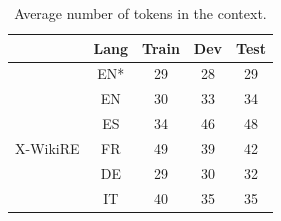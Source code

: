 \begin{table}[h!]
  \centering
    \begin{tabular}{c|c|ccc}
    \toprule
    \multicolumn{1}{r}{} & Lang  & Train & Dev   & Test \\
    \midrule
    \cite{levy2017zero} & EN*    & 29 & 28 & 29 \\
    \midrule
    \multirow{5}[2]{*}{X-WikiRE} & EN    & 30 & 33 & 34 \\
          & ES    & 34 & 46 & 48 \\
          & FR    & 49 & 39 & 42 \\
          & DE    & 29 & 30 & 32 \\
          & IT    & 40 & 35 & 35 \\
    \bottomrule
    \end{tabular}%
    \caption{Average number of tokens in the context.}
  \label{tab:addlabel}%
\end{table}%


